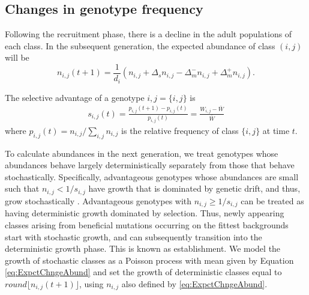 \documentclass[9pt,twocolumn,twoside]{article}
\begin{document}
\subsection{Changes in genotype frequency}

Following the recruitment phase, there is a decline in the adult populations of each class. In the subsequent generation, the expected abundance of class $(i,j)$ will be
\begin{equation} \label{eq:ExpctChngeAbund}
    n_{i,j}(t+1) = \frac{1}{d_i} (n_{i,j}+ \Delta_s n_{i,j} - \Delta_{m}^- n_{i,j}+\Delta_{m}^+ n_{i,j}).
\end{equation}

The selective advantage of a genotype ${i,j}=\{i,j\}$ is   
\begin{equation}\label{eq:SelAdvntg}
\begin{aligned}
s_{i,j}(t) = \frac{p_{i,j}(t+1)-p_{i,j}(t)}{p_{i,j}(t)} = \frac{W_{i,j}-\bar{W}}{\bar{W}}
\end{aligned}
\end{equation}
where $p_{i,j}(t) = n_{i,j}/\sum_{i,j} n_{i,j}$ is the relative frequency of class $\{i,j\}$ at time $t$.


To calculate abundances in the next generation, we treat genotypes whose abundances behave largely deterministically separately from those that behave stochastically.  Specifically, advantageous genotypes whose abundances are small such that $n_{i,j} < 1/s_{i,j}$ have growth that is dominated by genetic drift, and thus, grow stochastically \cite{desai2007beneficial}. Advantageous genotypes with $n_{i,j}\geq 1/s_{i,j}$ can be treated as having deterministic growth dominated by selection. Thus, newly appearing classes arising from beneficial mutations occurring on the fittest backgrounds start with stochastic growth, and can subsequently transition into the deterministic growth phase. This is known as establishment. We model the growth of stochastic classes as a Poisson process with mean given by Equation \eqref{eq:ExpctChngeAbund} and set the growth of deterministic classes equal to $round\lfloor n_{i,j}(t+1) \rfloor$, using $n_{i,j}$ also defined by \eqref{eq:ExpctChngeAbund}.


\end{document}
